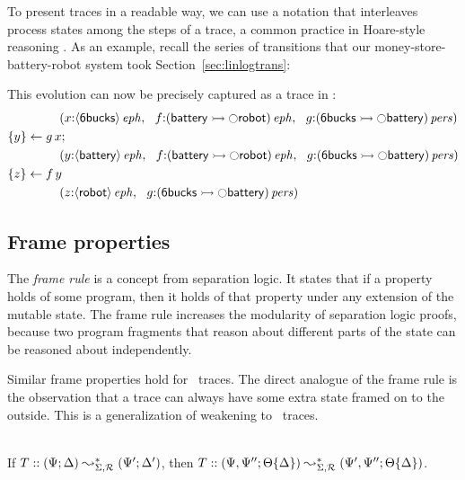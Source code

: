 To present traces in a readable way, we can use a notation that
interleaves process states among the steps of a trace, a common
practice in Hoare-style reasoning \cite{hoare71proof}.  As an example,
recall the series of transitions that our money-store-battery-robot
system took Section~\ref{sec:linlogtrans}: 
%

%
This evolution can now be precisely captured as a trace in \sls:
\begin{align*}
&\qquad\qquad
\left(
 x{:}{\langle {\sf 6bucks} \rangle}\,{{\it eph}}, ~~
 f{:}{({\sf battery} \rightarrowtail {\ocircle}{\sf robot})}\,{{\it eph}}, ~~
 g{:}{({\sf 6bucks} \rightarrowtail {\ocircle}{\sf battery})}\,{{\it pers}}
\right)
\\
&\{{y}\} \leftarrow {g\,x};
\\
&\qquad\qquad
\left(
 y{:}{\langle {\sf battery} \rangle}\,{{\it eph}}, ~~
 f{:}{({\sf battery} \rightarrowtail {\ocircle}{\sf robot})}\,{{\it eph}}, ~~
 g{:}{({\sf 6bucks} \rightarrowtail {\ocircle}{\sf battery})}\,{{\it pers}}
\right)
\\
&\{{z}\} \leftarrow {f\,y}
\\
&\qquad\qquad
\left(
 z{:}{\langle {\sf robot} \rangle}\,{{\it eph}}, ~~
 g{:}{({\sf 6bucks} \rightarrowtail {\ocircle}{\sf battery})}\,{{\it pers}}
\right)
\end{align*}

\subsection{Frame properties}

The {\it frame rule} is a concept from separation logic.  It
states that if a property holds of some program, then it holds of that
property under any extension of the mutable state. The frame rule
increases the modularity of separation logic proofs, because two
program fragments that reason about different parts of the state can
be reasoned about independently. 

Similar frame properties hold for \sls~traces. The direct analogue of
the frame rule is the observation that a trace can always have some
extra state framed on to the outside. This is a generalization of
weakening to \sls~traces.

\bigskip
\begin{theorem}\label{thm:frameweak}~\\
If $T :: (\Psi; \Delta) \leadsto^*_{\Sigma, \mathcal R} (\Psi'; \Delta')$, then
$T :: (\Psi, \Psi''; {\Theta}\{{\Delta}\})
       \leadsto^*_{\Sigma, \mathcal R} (\Psi', \Psi''; {\Theta}\{{\Delta}\})$.
\end{theorem}
\bigskip

